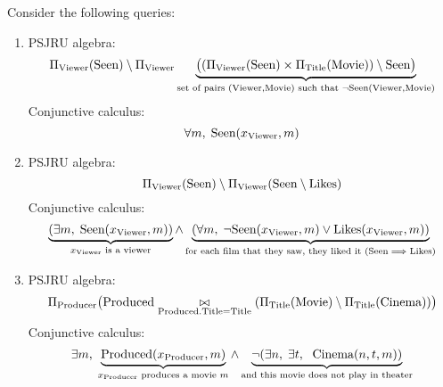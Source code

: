 \documentclass{../../cs-classes/cs-classes}
\newcommand*{\cinema}{\textnormal{Cinema}}
\newcommand*{\titl}{\textnormal{Title}}
\newcommand*{\movie}{\textnormal{Movie}}
\newcommand*{\seen}{\textnormal{Seen}}
\newcommand*{\likes}{\textnormal{Likes}}
\newcommand*{\produced}{\textnormal{Produced}}
\newcommand*{\producer}{\textnormal{Producer}}
\newcommand*{\viewer}{\textnormal{Viewer}}
\begin{document}
\begin{exercise}
    Consider the following queries:
  \begin{enumerate}
    \item PSJRU algebra:
    \begin{equation*}
        \Pi_{\viewer}(\seen)\setminus\Pi_{\viewer}\underbrace{\big((\Pi_{\viewer}(\seen)\times\Pi_{\titl}(\movie))\setminus\seen\big)}_{\textnormal{set of pairs }(\viewer, \movie) \textnormal{ such that } \lnot\seen(\viewer, \movie)}
    \end{equation*}
    Conjunctive calculus:
    \begin{equation*}
        \forall m, \; \seen(x_{\viewer}, m)
    \end{equation*}
    
    \item PSJRU algebra:
    \begin{equation*}
        \Pi_{\viewer}(\seen)\setminus\Pi_{\viewer}(\seen\setminus\likes)
    \end{equation*}
    Conjunctive calculus:
    \begin{equation*}
        \underbrace{(\exists m, \; \seen(x_{\viewer}, m))}_{x_{\viewer} \textnormal{ is a viewer}} \land \underbrace{(\forall m, \;\lnot \seen(x_{\viewer}, m)\lor\likes(x_{\viewer}, m))}_{\textnormal{for each film that they saw, they liked it } (\seen\implies\likes)}
    \end{equation*}
    
    \item PSJRU algebra:
    \begin{equation*}
        \Pi_{\producer}\big(\produced\underset{\produced.\titl = \titl}{\bowtie}(\Pi_{\titl}(\movie) \setminus \Pi_{\titl}(\cinema))\big)
    \end{equation*}
    Conjunctive calculus:
    \begin{equation*}
        \exists m, \; \underbrace{\produced(x_{\producer}, m)}_{x_{\producer} \textnormal{ produces a movie } m} \land \underbrace{\lnot(\exists n, \; \exists t, \; \cinema(n, t, m))}_{\textnormal{and this movie does not play in theater}}
    \end{equation*}
    

\end{enumerate}
\end{exercise}
\end{document}
